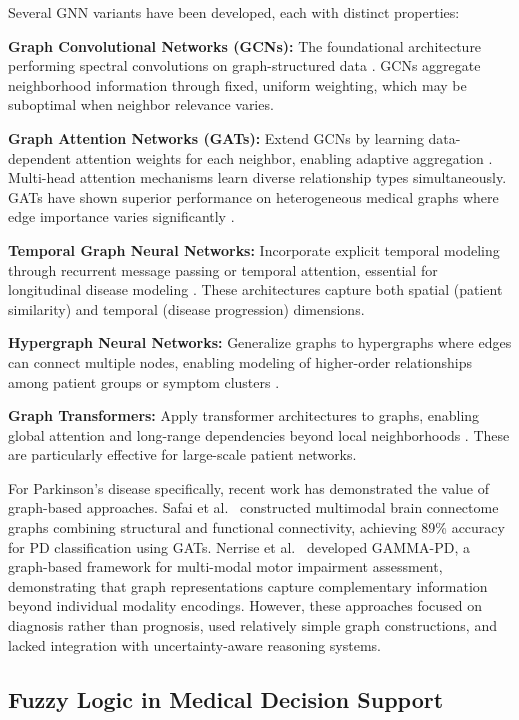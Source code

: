 \documentclass[conference]{IEEEtran}
\begin{document}
Several GNN variants have been developed, each with distinct properties:

\textbf{Graph Convolutional Networks (GCNs):} The foundational architecture performing spectral convolutions on graph-structured data \cite{Wu2021}. GCNs aggregate neighborhood information through fixed, uniform weighting, which may be suboptimal when neighbor relevance varies.

\textbf{Graph Attention Networks (GATs):} Extend GCNs by learning data-dependent attention weights for each neighbor, enabling adaptive aggregation \cite{Velickovic2018}. Multi-head attention mechanisms learn diverse relationship types simultaneously. GATs have shown superior performance on heterogeneous medical graphs where edge importance varies significantly \cite{Safai2022}.

\textbf{Temporal Graph Neural Networks:} Incorporate explicit temporal modeling through recurrent message passing or temporal attention, essential for longitudinal disease modeling \cite{Kim2021}. These architectures capture both spatial (patient similarity) and temporal (disease progression) dimensions.

\textbf{Hypergraph Neural Networks:} Generalize graphs to hypergraphs where edges can connect multiple nodes, enabling modeling of higher-order relationships among patient groups or symptom clusters \cite{Ding2024}.

\textbf{Graph Transformers:} Apply transformer architectures to graphs, enabling global attention and long-range dependencies beyond local neighborhoods \cite{Lope2024}. These are particularly effective for large-scale patient networks.

For Parkinson's disease specifically, recent work has demonstrated the value of graph-based approaches. Safai et al.\ \cite{Safai2022} constructed multimodal brain connectome graphs combining structural and functional connectivity, achieving 89\% accuracy for PD classification using GATs. Nerrise et al.\ \cite{Nerrise2024} developed GAMMA-PD, a graph-based framework for multi-modal motor impairment assessment, demonstrating that graph representations capture complementary information beyond individual modality encodings. However, these approaches focused on diagnosis rather than prognosis, used relatively simple graph constructions, and lacked integration with uncertainty-aware reasoning systems.

\subsection{Fuzzy Logic in Medical Decision Support}
\end{document}
